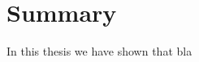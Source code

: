 %
%
%

\chapter{Summary}\label{chap:summ}
\enlargethispage{2ex}
\vspace*{-2pt}

In this thesis we have shown that bla


%
